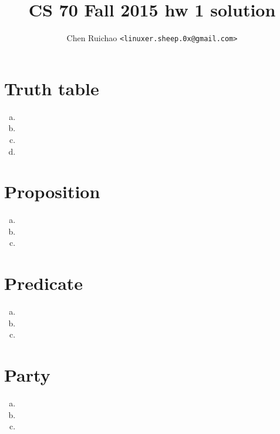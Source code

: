 \documentclass{article}
\begin{document}
\setlength{\parindent}{0px}

\title{CS 70 Fall 2015 hw 1 solution}
\author{Chen Ruichao \texttt{<linuxer.sheep.0x@gmail.com>}}
\date{} %
\maketitle




\section{Truth table}
\begin{enumerate}[(a)]
    \item
    \item
    \item
    \item
\end{enumerate}




\section{Proposition}
\begin{enumerate}[(a)]
    \item
    \item
    \item
\end{enumerate}




\section{Predicate}
\begin{enumerate}[(a)]
    \item
    \item
    \item
\end{enumerate}




\section{Party}
\begin{enumerate}[(a)]
    \item
    \item
    \item
\end{enumerate}
\end{document}
